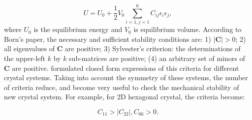 \begin{equation}
U=U_0+\frac{1}{2}V_0\sum_{i=1,j=1}^6 C_{ij}\epsilon_i\epsilon_j,
\end{equation}
where $U_0$ is the equilibrium energy and $V_0$ is equilibrium volume. According to Born's paper\cite{born_1940}, the necessary and sufficient stability conditions are: 1) $|\mathbf{C}|>0$; 2) all eigenvalues of $\mathbf{C}$ are positive; 3) Sylvester’s criterion: the determinations of the upper-left $k$ by $k$ sub-matrices are positive; (4) an arbitrary set of minors of $\mathbf{C}$ are positive. \citet{Mouhat2014} formulated closed form expressions of this criteria for different crystal systems. Taking into account the symmetry of these systems, the number of criteria reduce, and become very useful to check the mechanical stability of new crystal system. For example, for 2D hexagonal crystal, the criteria become:

\begin{equation}
C_{11}>|C_{22}|,C_{66}>0.
\end{equation}